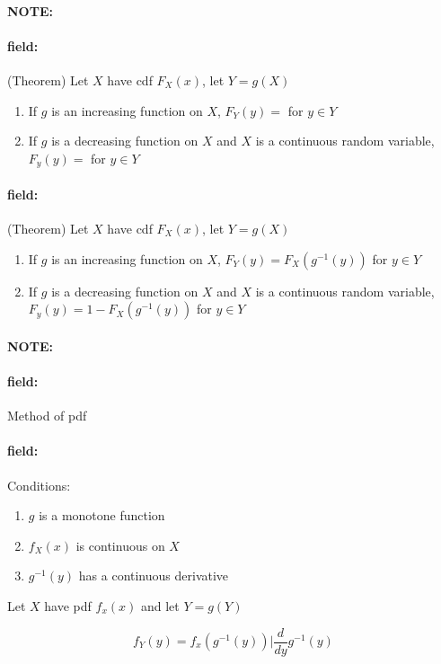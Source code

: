 \documentclass[12pt]{article}
\newenvironment{note}{\paragraph{NOTE:}}{}
\newenvironment{field}{\paragraph{field:}}{}
\begin{document}
\begin{note}
  \begin{field}
    (Theorem) Let $X$ have cdf $F_X(x)$, let $Y = g(X)$
    \begin{enumerate}
      \item If $g$ is an increasing function on $X$, $F_Y(y) = $ for $y \in Y$
      \item If $g$ is a decreasing function on $X$ and $X$ is a continuous random variable, $F_y(y) = $ for $y \in Y$
    \end{enumerate}
  \end{field}
  \begin{field}
    (Theorem) Let $X$ have cdf $F_X(x)$, let $Y = g(X)$
    \begin{enumerate}
      \item If $g$ is an increasing function on $X$, $F_Y(y) = F_X(g^{-1}(y))$ for $y \in Y$
      \item If $g$ is a decreasing function on $X$ and $X$ is a continuous random variable, $F_y(y) = 1 - F_X(g^{-1}(y))$ for $y \in Y$
    \end{enumerate}
  \end{field}
\end{note}


\begin{note}
  \begin{field}
    Method of pdf
  \end{field}
  \begin{field}
    Conditions:
    \begin{enumerate}
      \item $g$ is a monotone function
      \item $f_X(x)$ is continuous on $X$
      \item $g^{-1}(y)$ has a continuous derivative
    \end{enumerate}
    Let $X$ have pdf $f_x(x)$ and let $Y = g(Y)$

    $$f_Y(y) = f_x(g^{-1}(y))\big|\frac{d}{dy}g^{-1}(y)$$
  \end{field}
\end{note}
\end{document}
